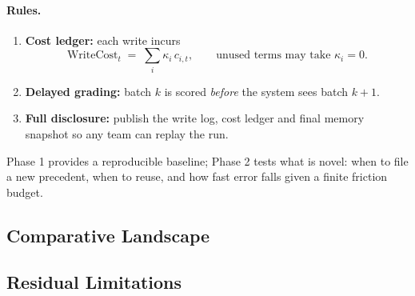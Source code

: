 \documentclass[11pt]{article}
\newcommand{\WriteCost}{\mathrm{WriteCost}}
\begin{document}
\paragraph{Rules.}
\begin{enumerate}\itemsep=2pt
\item \textbf{Cost ledger:} each write incurs
\[
\WriteCost_t \;=\; \sum_i \kappa_i\,c_{i,t},\qquad
\text{unused terms may take }\kappa_i=0.
\]
\item \textbf{Delayed grading:} batch \(k\) is scored \emph{before} the system sees batch \(k{+}1\).
\item \textbf{Full disclosure:} publish the write log, cost ledger and final memory snapshot so any team can replay the run.
\end{enumerate}

Phase 1 provides a reproducible baseline; Phase 2 tests what is novel: when to
file a new precedent, when to reuse, and how fast error falls given a finite friction budget.

\subsection{\quad Comparative Landscape}

\begin{center}
\end{center}

\subsection{\quad Residual Limitations}
\label{sec:residual-limitations}
\end{document}
